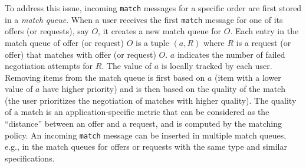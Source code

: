 To address this issue, incoming \texttt{match} messages for a specific order are first stored in a \emph{match queue}.
When a user receives the first \texttt{match} message for one of its offers (or requests), say $ O $, it creates a new match queue for $ O $.
Each entry in the match queue of offer (or request) $ O $ is a tuple $ (a, R) $ where $ R $ is a request (or offer) that matches with offer (or request) $ O $.
$ a $ indicates the number of failed negotiation attempts for $ R $.
The value of $ a $ is locally tracked by each user.
Removing items from the match queue is first based on $ a $ (item with a lower value of $ a $ have higher priority) and is then based on the quality of the match (the user prioritizes the negotiation of matches with higher quality).
The quality of a match is an application-specific metric that can be considered as the \enquote{distance} between an offer and a request, and is computed by the matching policy.
An incoming \texttt{match} message can be inserted in multiple match queues, e.g., in the match queues for offers or requests with the same type and similar specifications.

